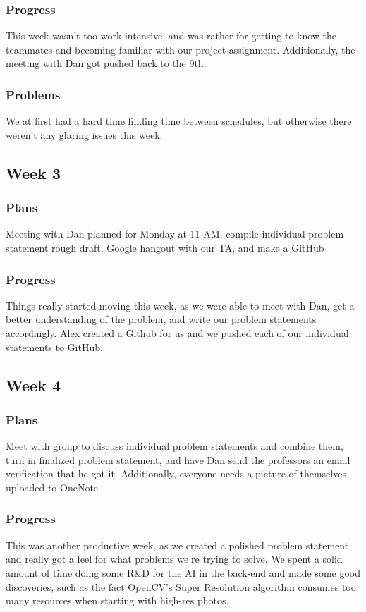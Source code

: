 \documentclass[onecolumn, draftclsnofoot,10pt, compsoc]{IEEEtran}
\begin{document}
        \subsubsection{Progress}
        This week wasn't too work intensive, and was rather for getting to know the teammates and becoming familiar with our project assignment. Additionally, the meeting with Dan got pushed back to the 9th.
        \subsubsection{Problems}
        We at first had a hard time finding time between schedules, but otherwise there weren't any glaring issues this week.
    \subsection{Week 3}
        \subsubsection{Plans}
        Meeting with Dan planned for Monday at 11 AM, compile individual problem statement rough draft, Google hangout with our TA, and make a GitHub

        \subsubsection{Progress}
        Things really started moving this week, as we were able to meet with Dan, get a better understanding of the problem, and write our problem statements accordingly. Alex created a Github for us and we pushed each of our individual statements to GitHub.
    \subsection{Week 4}
        \subsubsection{Plans}
        Meet with group to discuss individual problem statements and combine them, turn in finalized problem statement, and have Dan send the professors an email verification that he got it. Additionally, everyone needs a picture of themselves uploaded to OneNote
        \subsubsection{Progress}
        This was another productive week, as we created a polished problem statement and really got a feel for what problems we're trying to solve. We spent a solid amount of time doing some R\&D for the AI in the back-end and made some good discoveries, such as the fact OpenCV's Super Resolution algorithm consumes too many resources when starting with high-res photos.
\end{document}
